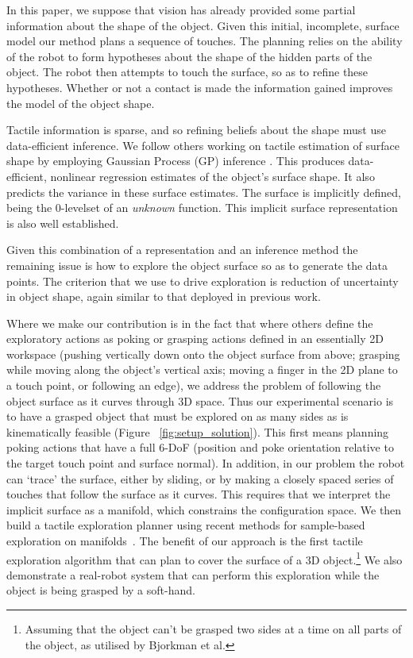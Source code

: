 In this paper, we suppose that vision has already provided some partial information about the shape of the object. Given this initial, incomplete, surface model our method plans a  sequence of touches. The planning relies on the ability of the robot to form hypotheses about the shape of the hidden parts of the object. The robot then attempts to touch the surface, so as to refine these hypotheses. Whether or not a contact is made the information gained improves the model of the object shape.

Tactile information is sparse, and so refining beliefs about the shape must use data-efficient inference. We follow others working on tactile estimation of surface shape \cite{Dragiev2011Gaussian,Bjorkman2013Enhancing,Sommer2014Bimanual} by employing Gaussian Process (GP) inference \cite{Rasmussen2006Gaussian}.  This produces data-efficient, nonlinear regression estimates of the object's surface shape. It also predicts the variance in these surface estimates. The surface is implicitly defined, being the $0$-levelset of an \emph{unknown} function. This implicit surface representation is also well established.

Given this combination of a representation and an inference method the remaining issue is how to explore the object surface so as to generate the data points. The criterion that we use to drive exploration is reduction of uncertainty in object shape, again similar to that deployed in previous work. 

Where we make our contribution is in the fact that where others define the exploratory actions as poking or grasping actions defined in an essentially 2D workspace (pushing vertically down onto the object surface from above; grasping while moving along the object's vertical axis; moving a finger in the 2D plane to a touch point, or following an edge), we address the problem of following the object surface as it curves through 3D space. Thus our experimental scenario is to have a grasped object that must be explored on as many sides as is kinematically feasible (Figure ~\ref{fig:setup_solution}). This first means planning poking actions that have a full 6-DoF (position and poke orientation relative to the target touch point and surface normal). In addition, in our problem the robot can `trace' the surface, either by sliding, or by making a closely spaced series of touches that follow the surface as it curves. This requires that we interpret the implicit surface as a manifold, which constrains the configuration space. We then build a tactile exploration planner using recent methods for sample-based exploration on manifolds~\cite{Jaillet2013Path}. The benefit of our approach is the first tactile exploration algorithm that can plan to cover the surface of a 3D object.\footnote{Assuming that the object can't be grasped two sides at a time on all parts of the object, as utilised by Bjorkman et al.} We also demonstrate a real-robot system that can perform this exploration while the object is being grasped by a soft-hand.

